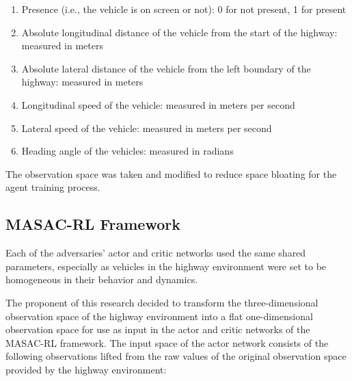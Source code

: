 \documentclass[12pt, a4paper]{report}
\begin{document}
\begin{enumerate}
    \item Presence (i.e., the vehicle is on screen or not): 0 for not present, 1 for present
    \item Absolute longitudinal distance of the vehicle from the start of the highway: measured in meters
    \item Absolute lateral distance of the vehicle from the left boundary of the highway: measured in meters
    \item Longitudinal speed of the vehicle: measured in meters per second
    \item Lateral speed of the vehicle: measured in meters per second
    \item Heading angle of the vehicles: measured in radians
\end{enumerate}

The observation space was taken and modified to reduce space bloating for the agent training process.

\subsection{MASAC-RL Framework}

Each of the adversaries' actor and critic networks used the same shared parameters, especially as
vehicles in the highway environment were set to be homogeneous in their behavior and dynamics.

The proponent of this research decided to transform the three-dimensional observation space of the highway environment into a flat one-dimensional observation
space for use as input in the actor and critic networks of the MASAC-RL framework. The input space of the actor network consists of the following observations lifted
from the raw values of the original observation space provided by the highway environment:
\end{document}
